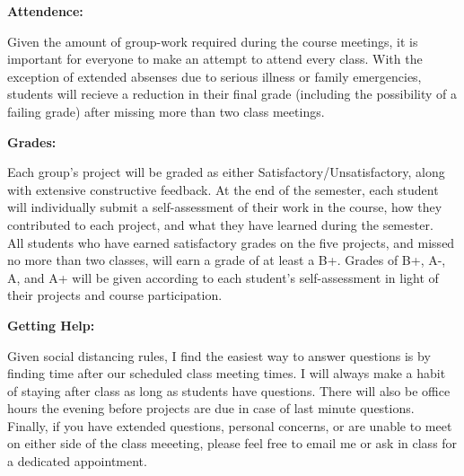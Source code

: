 \documentclass[12pt, a4paper]{article}
\begin{document}
\vspace{12pt}

\textbf{Attendence:} \vspace{6pt}

Given the amount of group-work required during the course meetings, it is
important for everyone to make an attempt to attend every class. With the
exception of extended absenses due to serious illness or family emergencies,
students will recieve a reduction in their final grade (including the
possibility of a failing grade) after missing more than two class meetings.

\vspace{12pt}

\textbf{Grades:} \vspace{6pt}

Each group's project will be graded as either Satisfactory/Unsatisfactory,
along with extensive constructive feedback. At the end of the semester, each
student will individually submit a self-assessment of their work in the course,
how they contributed to each project, and what they have learned during the
semester.\\

All students who have earned satisfactory grades on the five projects, and
missed no more than two classes, will earn a grade of at least a B+. Grades of
B+, A-, A, and A+ will be given according to each student's self-assessment in
light of their projects and course participation.

\vspace{12pt}

\textbf{Getting Help:} \vspace{6pt}

Given social distancing rules, I find the easiest way to answer questions
is by finding time after our scheduled class meeting times. I will always make
a habit of staying after class as long as students have questions. There will
also be office hours the evening before projects are due in case of last minute
questions. Finally, if you have extended questions, personal concerns, or are
unable to meet on either side of the class meeeting, please feel free to email
me or ask in class for a dedicated appointment.
\end{document}
